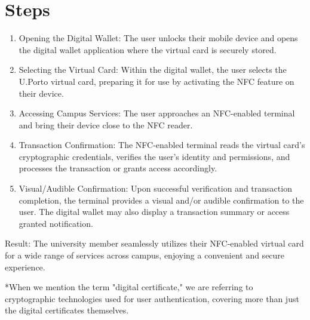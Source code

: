 \documentclass[10pt]{article}
\begin{document}
\section*{Steps}
\begin{enumerate}
  \item Opening the Digital Wallet: The user unlocks their mobile device and opens the digital wallet application where the virtual card is securely stored.

  \item Selecting the Virtual Card: Within the digital wallet, the user selects the U.Porto virtual card, preparing it for use by activating the NFC feature on their device.

  \item Accessing Campus Services: The user approaches an NFC-enabled terminal and bring their device close to the NFC reader.

  \item Transaction Confirmation: The NFC-enabled terminal reads the virtual card's cryptographic credentials, verifies the user's identity and permissions, and processes the transaction or grants access accordingly.

  \item Visual/Audible Confirmation: Upon successful verification and transaction completion, the terminal provides a visual and/or audible confirmation to the user. The digital wallet may also display a transaction summary or access granted notification.

\end{enumerate}

Result: The university member seamlessly utilizes their NFC-enabled virtual card for a wide range of services across campus, enjoying a convenient and secure experience.

*When we mention the term "digital certificate," we are referring to cryptographic technologies used for user authentication, covering more than just the digital certificates themselves.
\end{document}
